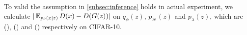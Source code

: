 To valid the assumption in \cref{subsec:inference} holds in actual experiment, we calculate $|\operatorname{\mathbb{E}}_{p_\theta(x|z)}D(x) - D(G(z))|$ on $q_\phi(z)$, $p_\mathcal{N}(z)$ and $p_\lambda(z)$, which are (), () and () respectively on CIFAR-10. 






